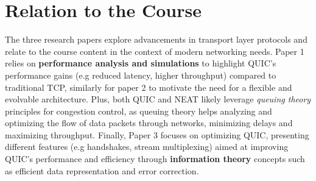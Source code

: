 \section{Relation to the Course}%
\label{sec:Relation to the Course}

The three research papers explore advancements in transport layer protocols and relate to the course content in the context of modern networking needs.
Paper 1 relies on \textbf{performance analysis and simulations} to highlight QUIC's performance gains (e.g reduced latency, higher throughput) compared to traditional TCP, similarly for paper 2 to motivate the need for a flexible and evolvable architecture. Plus, both QUIC and NEAT likely leverage \textit{queuing theory} principles for congestion control, as queuing theory helps analyzing and optimizing the flow of data packets through networks, minimizing delays and maximizing throughput. Finally, Paper 3 focuses on optimizing QUIC, presenting different features (e.g handshakes, stream multiplexing) aimed at improving QUIC's performance and efficiency through \textbf{information theory} concepts such as efficient data representation and error correction. 

